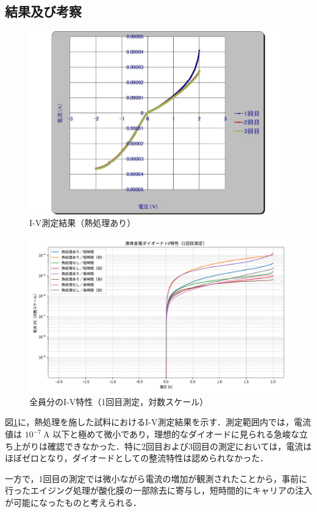 \subsection{結果及び考察}

\begin{figure}[H]
  \centering
  \includegraphics[width=0.65\linewidth]{figure/20250728_1111.pdf} %
  \caption{I-V測定結果（熱処理あり）}
  \label{fig:iv_heat}
\end{figure}

\begin{figure}[H]
  \centering
  \includegraphics[width=0.75\linewidth]{figure/iv_all_first.pdf}
  \caption{全員分のI-V特性（1回目測定，対数スケール）}
  \label{fig:iv_all_first}
\end{figure}

図\ref{fig:iv_heat}に，熱処理を施した試料におけるI-V測定結果を示す．測定範囲内では，電流値は $10^{-7}~\mathrm{A}$ 以下と極めて微小であり，理想的なダイオードに見られる急峻な立ち上がりは確認できなかった．特に2回目および3回目の測定においては，電流はほぼゼロとなり，ダイオードとしての整流特性は認められなかった．

一方で，1回目の測定では微小ながら電流の増加が観測されたことから，事前に行ったエイジング処理が酸化膜の一部除去に寄与し，短時間的にキャリアの注入が可能になったものと考えられる．

